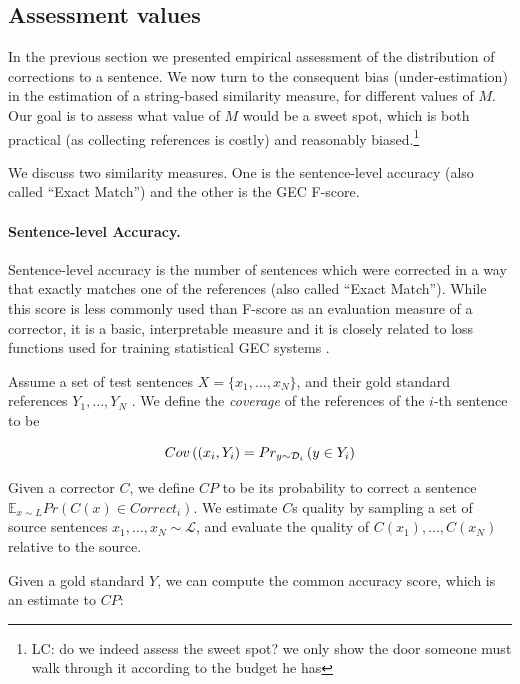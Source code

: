 \documentclass[letter,11pt]{article}
\newcommand{\lc}[1]{\footnote{\color{green}LC: #1}}
\begin{document}
		\subsection{Assessment values} \label{subsec:Assessment-values}
		
		In the previous section we presented empirical assessment of the distribution of
		corrections to a sentence. We now turn to the consequent bias (under-estimation) in the estimation of a string-based similarity measure, for different values of $M$. Our goal is to assess what value of $M$ would be a sweet spot, which is both practical (as collecting references is costly) and reasonably biased.\lc{do we indeed assess the sweet spot? we only show the door someone must walk through it according to the budget he has}
		
		We discuss two similarity measures. One is the sentence-level accuracy (also called ``Exact Match'') and the other is the GEC F-score.
		
		\paragraph{Sentence-level Accuracy.}
		Sentence-level accuracy is the number of sentences which were corrected in a way that exactly matches one of the
		references (also called ``Exact Match''). While this score is less commonly used than F-score as an evaluation
		measure of a corrector, it is a basic, interpretable measure and it is closely related to loss functions used for
		training statistical GEC systems \cite{rozovskaya2010training,chodorow2012problems,rozovskaya2013joint}. 
		
		Assume a set of test sentences $X=\{x_1,\ldots,x_N\}$,
		and their gold standard references $Y_1,\ldots,Y_N$ . We define the
		{\it coverage} of the references of the $i$-th sentence to be
		
		\begin{equation}
		\footnotesize
		Cov\left((x_i,Y_i\right)=Pr_{y \sim \mathcal{D}_i}\left(y \in Y_i\right)
		\end{equation}
		
		Given a corrector $C$, we define $CP$ to be its probability to correct a sentence $\mathbb{E}_{x\sim{L}}Pr\left(C\left(x\right)\in Correct_i\right)$. We estimate $C$s quality by sampling a set of source sentences
		$x_1,\ldots,x_N \sim \mathcal{L}$, and evaluate the quality of $C(x_1),\ldots,C(x_N)$ relative
		to the source. 
		
		Given a gold standard $Y$, we can compute the common accuracy score, which is an estimate to $CP$:
		
\end{document}
